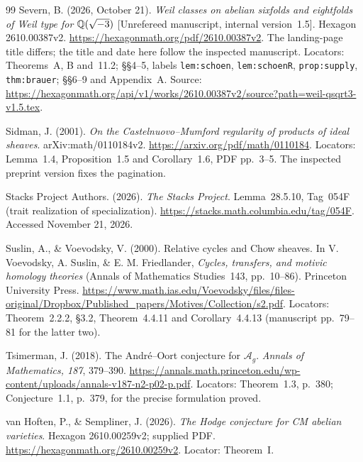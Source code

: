 \begin{thebibliography}{99}
Severn, B. (2026, October 21). \emph{Weil classes on abelian sixfolds and eightfolds of Weil type for $\mathbb Q(\sqrt{-3})$} [Unrefereed manuscript, internal version~1.5]. Hexagon 2610.00387v2. \url{https://hexagonmath.org/pdf/2610.00387v2}. The landing-page title differs; the title and date here follow the inspected manuscript. Locators: Theorems~A, B and~11.2; \S\S4--5, labels \texttt{lem:schoen}, \texttt{lem:schoenR}, \texttt{prop:supply}, \texttt{thm:brauer}; \S\S6--9 and Appendix~A. Source: \url{https://hexagonmath.org/api/v1/works/2610.00387v2/source?path=weil-qsqrt3-v1.5.tex}.

Sidman, J. (2001). \emph{On the Castelnuovo--Mumford regularity of products of ideal sheaves}. arXiv:math/0110184v2. \url{https://arxiv.org/pdf/math/0110184}. Locators: Lemma~1.4, Proposition~1.5 and Corollary~1.6, PDF pp.~3--5. The inspected preprint version fixes the pagination.

Stacks Project Authors. (2026). \emph{The Stacks Project}. Lemma~28.5.10, Tag~054F (trait realization of specialization). \url{https://stacks.math.columbia.edu/tag/054F}. Accessed November 21, 2026.

Suslin, A., \& Voevodsky, V. (2000). Relative cycles and Chow sheaves. In V. Voevodsky, A. Suslin, \& E. M. Friedlander, \emph{Cycles, transfers, and motivic homology theories} (Annals of Mathematics Studies~143, pp.~10--86). Princeton University Press. \url{https://www.math.ias.edu/Voevodsky/files/files-original/Dropbox/Published_papers/Motives/Collection/s2.pdf}. Locators: Theorem~2.2.2, \S3.2, Theorem~4.4.11 and Corollary~4.4.13 (manuscript pp.~79--81 for the latter two).

Tsimerman, J. (2018). The Andr\'e--Oort conjecture for $\mathcal A_g$. \emph{Annals of Mathematics, 187}, 379--390. \url{https://annals.math.princeton.edu/wp-content/uploads/annals-v187-n2-p02-p.pdf}. Locators: Theorem~1.3, p.~380; Conjecture~1.1, p.~379, for the precise formulation proved.

van Hoften, P., \& Sempliner, J. (2026). \emph{The Hodge conjecture for CM abelian varieties}. Hexagon 2610.00259v2; supplied PDF. \url{https://hexagonmath.org/2610.00259v2}. Locator: Theorem~I.
\end{thebibliography}
